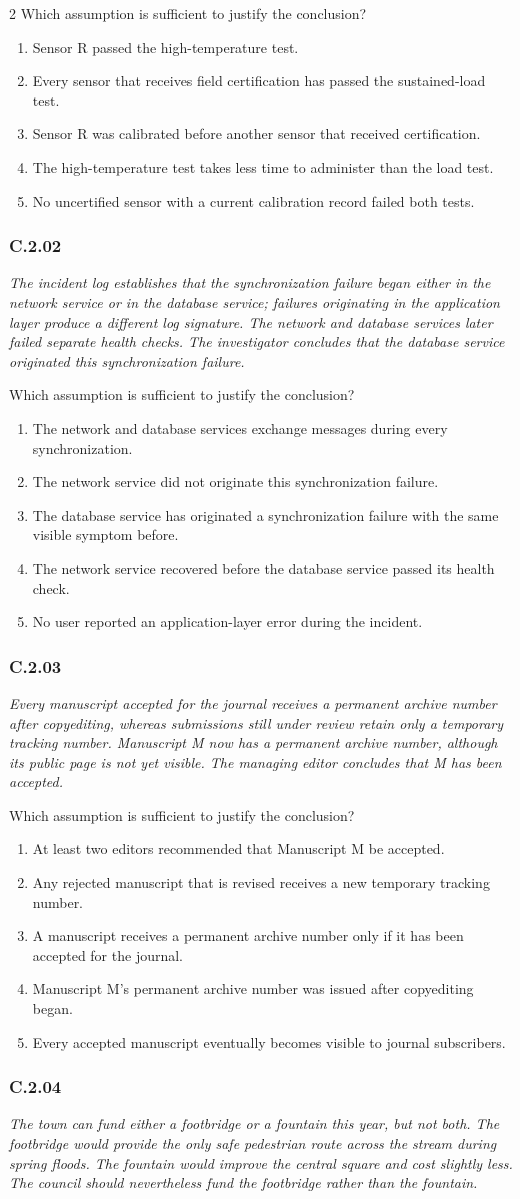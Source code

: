 \documentclass[10pt]{extarticle}
\newcommand{\choice}[1]{\item #1}
\newcommand{\bankitem}[1]{\subsubsection*{#1}}
\begin{document}
\begin{multicols}{2}
Which assumption is sufficient to justify the conclusion?
\begin{enumerate}[label=(\alph*)]
  \choice{Sensor R passed the high-temperature test.}
  \choice{Every sensor that receives field certification has passed the sustained-load test.}
  \choice{Sensor R was calibrated before another sensor that received certification.}
  \choice{The high-temperature test takes less time to administer than the load test.}
  \choice{No uncertified sensor with a current calibration record failed both tests.}
\end{enumerate}
\bankitem{C.2.02}
\emph{The incident log establishes that the synchronization failure began either in the network service or in the database service; failures originating in the application layer produce a different log signature. The network and database services later failed separate health checks. The investigator concludes that the database service originated this synchronization failure.}

Which assumption is sufficient to justify the conclusion?
\begin{enumerate}[label=(\alph*)]
  \choice{The network and database services exchange messages during every synchronization.}
  \choice{The network service did not originate this synchronization failure.}
  \choice{The database service has originated a synchronization failure with the same visible symptom before.}
  \choice{The network service recovered before the database service passed its health check.}
  \choice{No user reported an application-layer error during the incident.}
\end{enumerate}
\bankitem{C.2.03}
\emph{Every manuscript accepted for the journal receives a permanent archive number after copyediting, whereas submissions still under review retain only a temporary tracking number. Manuscript M now has a permanent archive number, although its public page is not yet visible. The managing editor concludes that M has been accepted.}

Which assumption is sufficient to justify the conclusion?
\begin{enumerate}[label=(\alph*)]
  \choice{At least two editors recommended that Manuscript M be accepted.}
  \choice{Any rejected manuscript that is revised receives a new temporary tracking number.}
  \choice{A manuscript receives a permanent archive number only if it has been accepted for the journal.}
  \choice{Manuscript M's permanent archive number was issued after copyediting began.}
  \choice{Every accepted manuscript eventually becomes visible to journal subscribers.}
\end{enumerate}
\bankitem{C.2.04}
\emph{The town can fund either a footbridge or a fountain this year, but not both. The footbridge would provide the only safe pedestrian route across the stream during spring floods. The fountain would improve the central square and cost slightly less. The council should nevertheless fund the footbridge rather than the fountain.}


\end{multicols}
\end{document}
